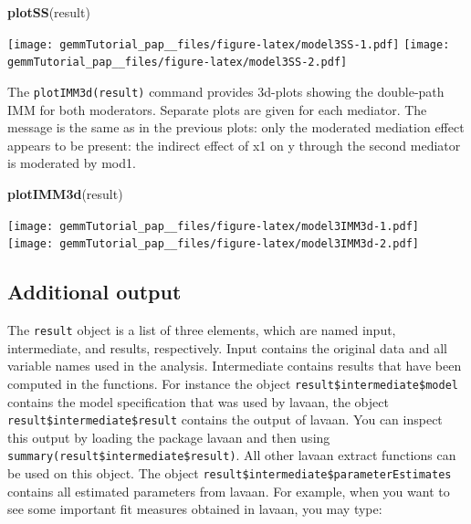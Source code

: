 \documentclass[man,floatsintext]{apa6}
\newenvironment{Shaded}{\begin{snugshade}}{\end{snugshade}}
\newcommand{\KeywordTok}[1]{\textcolor[rgb]{0.13,0.29,0.53}{\textbf{#1}}}
\newcommand{\StringTok}[1]{\textcolor[rgb]{0.31,0.60,0.02}{#1}}
\newcommand{\OperatorTok}[1]{\textcolor[rgb]{0.81,0.36,0.00}{\textbf{#1}}}
\newcommand{\NormalTok}[1]{#1}
\theoremstyle{definition}
\theoremstyle{definition}
\theoremstyle{definition}
\theoremstyle{remark}
\begin{document}
\begin{Shaded}
\begin{Highlighting}[]
\KeywordTok{plotSS}\NormalTok{(result)}
\end{Highlighting}
\end{Shaded}

\texttt{[image: gemmTutorial\_pap\_\_files/figure-latex/model3SS-1.pdf]}
\texttt{[image: gemmTutorial\_pap\_\_files/figure-latex/model3SS-2.pdf]}

The \texttt{plotIMM3d(result)} command provides 3d-plots showing the
double-path IMM for both moderators. Separate plots are given for each
mediator. The message is the same as in the previous plots: only the
moderated mediation effect appears to be present: the indirect effect of
x1 on y through the second mediator is moderated by mod1.

\begin{Shaded}
\begin{Highlighting}[]
\KeywordTok{plotIMM3d}\NormalTok{(result)}
\end{Highlighting}
\end{Shaded}

\texttt{[image: gemmTutorial\_pap\_\_files/figure-latex/model3IMM3d-1.pdf]}
\texttt{[image: gemmTutorial\_pap\_\_files/figure-latex/model3IMM3d-2.pdf]}

\subsection{Additional output}\label{additional-output}

The \texttt{result} object is a list of three elements, which are named
input, intermediate, and results, respectively. Input contains the
original data and all variable names used in the analysis. Intermediate
contains results that have been computed in the functions. For instance
the object \texttt{result\$intermediate\$model} contains the model
specification that was used by lavaan, the object
\texttt{result\$intermediate\$result} contains the output of lavaan. You
can inspect this output by loading the package lavaan and then using
\texttt{summary(result\$intermediate\$result)}. All other lavaan extract
functions can be used on this object. The object
\texttt{result\$intermediate\$parameterEstimates} contains all estimated
parameters from lavaan. For example, when you want to see some important
fit measures obtained in lavaan, you may type:

\begin{Shaded}
\end{Shaded}
\end{document}
